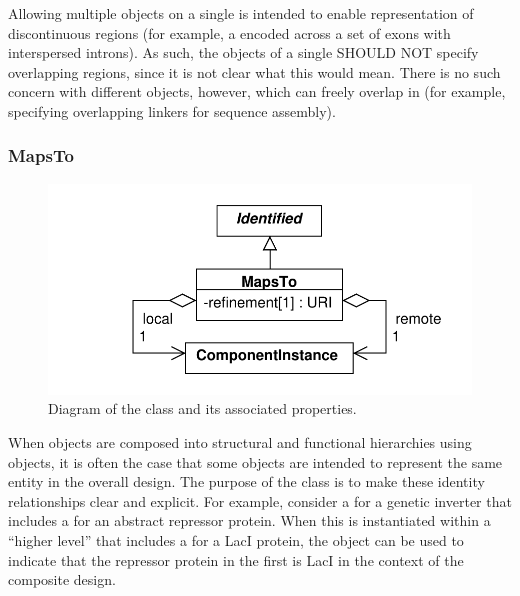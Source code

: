 Allowing multiple  objects on a single  is intended to enable representation of discontinuous regions (for example, a  encoded across a set of exons with interspersed introns).
As such, the  objects of a single  SHOULD NOT specify overlapping regions, since it is not clear what this would mean.
There is no such concern with different  objects, however, which can freely overlap in  (for example, specifying overlapping linkers for sequence assembly).


\subsubsection{MapsTo}
\label{sec:MapsTo}

\begin{figure}[ht]
\begin{center}
\includegraphics[scale=0.6]{uml/maps_to}
\caption[]{Diagram of the  class and its associated properties.}
\label{uml:maps_to}
\end{center}
\end{figure}

When  objects are composed into structural and functional hierarchies using  objects, it is often the case that some  objects are intended to represent the same entity in the overall design. The purpose of the  class is to make these identity relationships clear and explicit.  For example, consider a  for a genetic inverter that includes a  for an abstract repressor protein.  When this  is instantiated within a ``higher level''  that includes a  for a LacI protein, the  object can be used to indicate that the repressor protein in the first  is LacI in the context of the composite design.

